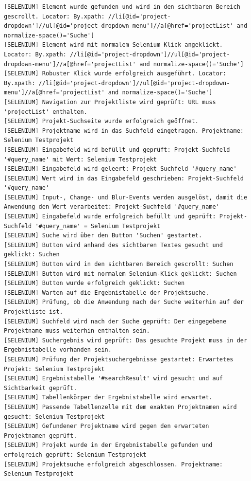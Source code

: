 \begin{lstlisting}[caption={Selenium -- Kontrolllauf Activity bearbeiten (Erfolgreich)}, label={lst:sel_ctrl_act_ok}, style=logStyle]
[SELENIUM] Element wurde gefunden und wird in den sichtbaren Bereich gescrollt. Locator: By.xpath: //li[@id='project-dropdown']//ul[@id='project-dropdown-menu']//a[@href='projectList' and normalize-space()='Suche']
[SELENIUM] Element wird mit normalem Selenium-Klick angeklickt. Locator: By.xpath: //li[@id='project-dropdown']//ul[@id='project-dropdown-menu']//a[@href='projectList' and normalize-space()='Suche']
[SELENIUM] Robuster Klick wurde erfolgreich ausgeführt. Locator: By.xpath: //li[@id='project-dropdown']//ul[@id='project-dropdown-menu']//a[@href='projectList' and normalize-space()='Suche']
[SELENIUM] Navigation zur Projektliste wird geprüft: URL muss 'projectList' enthalten.
[SELENIUM] Projekt-Suchseite wurde erfolgreich geöffnet.
[SELENIUM] Projektname wird in das Suchfeld eingetragen. Projektname: Selenium Testprojekt
[SELENIUM] Eingabefeld wird befüllt und geprüft: Projekt-Suchfeld '#query_name' mit Wert: Selenium Testprojekt
[SELENIUM] Eingabefeld wird geleert: Projekt-Suchfeld '#query_name'
[SELENIUM] Wert wird in das Eingabefeld geschrieben: Projekt-Suchfeld '#query_name'
[SELENIUM] Input-, Change- und Blur-Events werden ausgelöst, damit die Anwendung den Wert verarbeitet: Projekt-Suchfeld '#query_name'
[SELENIUM] Eingabefeld wurde erfolgreich befüllt und geprüft: Projekt-Suchfeld '#query_name' = Selenium Testprojekt
[SELENIUM] Suche wird über den Button 'Suchen' gestartet.
[SELENIUM] Button wird anhand des sichtbaren Textes gesucht und geklickt: Suchen
[SELENIUM] Button wird in den sichtbaren Bereich gescrollt: Suchen
[SELENIUM] Button wird mit normalem Selenium-Klick geklickt: Suchen
[SELENIUM] Button wurde erfolgreich geklickt: Suchen
[SELENIUM] Warten auf die Ergebnistabelle der Projektsuche.
[SELENIUM] Prüfung, ob die Anwendung nach der Suche weiterhin auf der Projektliste ist.
[SELENIUM] Suchfeld wird nach der Suche geprüft: Der eingegebene Projektname muss weiterhin enthalten sein.
[SELENIUM] Suchergebnis wird geprüft: Das gesuchte Projekt muss in der Ergebnistabelle vorhanden sein.
[SELENIUM] Prüfung der Projektsuchergebnisse gestartet: Erwartetes Projekt: Selenium Testprojekt
[SELENIUM] Ergebnistabelle '#searchResult' wird gesucht und auf Sichtbarkeit geprüft.
[SELENIUM] Tabellenkörper der Ergebnistabelle wird erwartet.
[SELENIUM] Passende Tabellenzelle mit dem exakten Projektnamen wird gesucht: Selenium Testprojekt
[SELENIUM] Gefundener Projektname wird gegen den erwarteten Projektnamen geprüft.
[SELENIUM] Projekt wurde in der Ergebnistabelle gefunden und erfolgreich geprüft: Selenium Testprojekt
[SELENIUM] Projektsuche erfolgreich abgeschlossen. Projektname: Selenium Testprojekt

\end{lstlisting}
